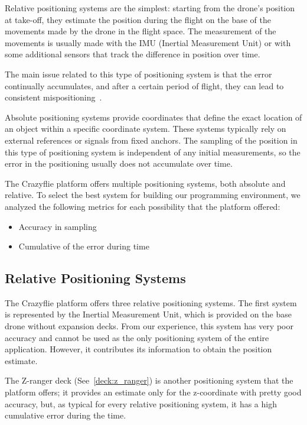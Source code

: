 Relative positioning systems are the simplest: starting from the drone's position at take-off, they estimate the position during the flight on the base of the movements made by the drone in the flight space. 
The measurement of the movements is usually made with the IMU (Inertial Measurement Unit) or with some additional sensors that track the difference in position over time.

The main issue related to this type of positioning system is that the error continually accumulates, and after a certain period of flight, they
can lead to consistent mispositioning~\cite{jametoni2021study}.

Absolute positioning systems provide coordinates that define the exact location of an object within a specific coordinate system. 
These systems typically rely on external references or signals from fixed anchors.
The sampling of the position in this type of positioning system is independent of any initial measurements, so the error in the positioning usually does not accumulate over time.


The Crazyflie platform offers multiple positioning systems, both absolute and relative. 
To select the best system for building our programming environment, we analyzed the following metrics for each possibility that the platform offered:
\begin{itemize}
    \item Accuracy in sampling
    \item Cumulative of the error during time
\end{itemize}


\subsection{Relative Positioning Systems}\label{subsec:relative_positioning_systems}
The Crazyflie platform offers three relative positioning systems. 
The first system is represented by the Inertial Measurement Unit, which is provided on the base drone without expansion decks. 
From our experience, this system has very poor accuracy and cannot be used as the only positioning system of the entire application.
However, it contributes its information to obtain the position estimate.

The Z-ranger deck (See~\ref{deck:z_ranger}) is another positioning system that the platform offers; it provides an estimate only for the z-coordinate with pretty good accuracy, but, as typical for every relative positioning system, it has a high cumulative error during the time. 

